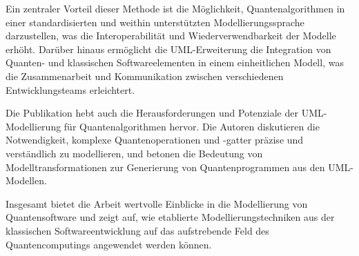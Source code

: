 Ein zentraler Vorteil dieser Methode ist die Möglichkeit, Quantenalgorithmen in einer standardisierten und 
weithin unterstützten Modellierungssprache darzustellen, was die Interoperabilität und Wiederverwendbarkeit 
der Modelle erhöht. Darüber hinaus ermöglicht die UML-Erweiterung die Integration von Quanten- und klassischen 
Softwareelementen in einem einheitlichen Modell, was die Zusammenarbeit und Kommunikation zwischen verschiedenen 
Entwicklungsteams erleichtert.

Die Publikation hebt auch die Herausforderungen und Potenziale der UML-Modellierung für Quantenalgorithmen hervor. 
Die Autoren diskutieren die Notwendigkeit, komplexe Quantenoperationen und -gatter präzise und verständlich zu 
modellieren, und betonen die Bedeutung von Modelltransformationen zur Generierung von Quantenprogrammen aus den UML-Modellen.

Insgesamt bietet die Arbeit wertvolle Einblicke in die Modellierung von Quantensoftware und zeigt auf, wie 
etablierte Modellierungstechniken aus der klassischen Softwareentwicklung auf das aufstrebende Feld des 
Quantencomputings angewendet werden können.